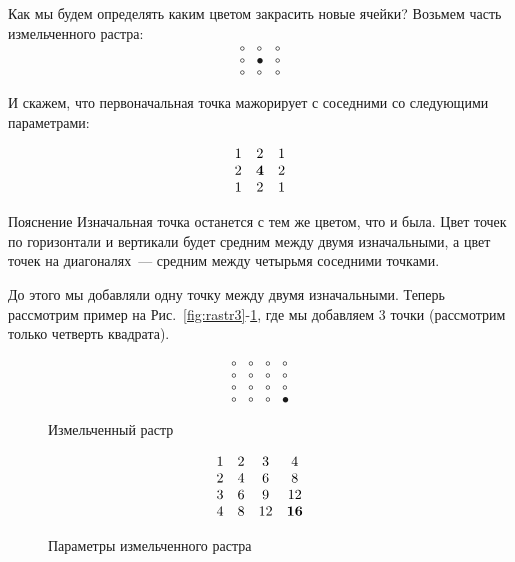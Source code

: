 Как мы будем определять каким цветом закрасить новые ячейки?
Возьмем часть измельченного растра:
$$
    \begin{matrix}
        \circ & \circ   & \circ \\
        \circ & \bullet & \circ \\
        \circ & \circ   & \circ
    \end{matrix}
$$

И скажем, что первоначальная точка мажорирует с соседними со следующими параметрами:

$$
    \begin{matrix} 1 & 2 & 1 \\ 2 & \bf4 & 2 \\ 1& 2 & 1 \end{matrix}
$$

\begin{callout}{Пояснение}
    Изначальная точка останется с тем же цветом, что и была. Цвет точек по горизонтали и вертикали будет средним между двумя изначальными, а цвет точек на диагоналях~--- средним между четырьмя соседними точками.
\end{callout}

До этого мы добавляли одну точку между двумя изначальными. Теперь рассмотрим пример на Рис.~\ref{fig:rastr3}-\ref{fig:rastr4}, где мы добавляем 3 точки (рассмотрим только четверть квадрата).

\begin{figure}[h!]
    \centering
    \begin{minipage}{0.3\textwidth}
        $$
            \begin{matrix}
                \circ & \circ & \circ & \circ   \\
                \circ & \circ & \circ & \circ   \\
                \circ & \circ & \circ & \circ   \\
                \circ & \circ & \circ & \bullet
            \end{matrix}
        $$
        \caption{Измельченный растр}
        \label{fig:rastr3}
    \end{minipage} %
    \hspace{0.1\textwidth}
    \begin{minipage}{0.3\textwidth}
        $$
            \begin{matrix}
                1 & 2 & 3  & 4       \\
                2 & 4 & 6  & 8       \\
                3 & 6 & 9  & 12      \\
                4 & 8 & 12 & \bf{16}
            \end{matrix}
        $$
        \caption{Параметры измельченного растра}
        \label{fig:rastr4}
    \end{minipage}
\end{figure}

